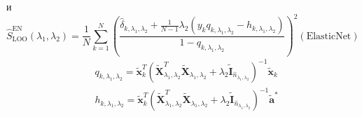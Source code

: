 \documentclass[12pt, twoside]{article}
\begin{document}
и
\begin{equation}
\hat{S}_{\mathrm{LOO}}^{\mathrm{EN}}\left(\lambda_{1}, \lambda_{2}\right)=\frac{1}{N} \sum_{k=1}^{N}\left(\frac{\hat{\delta}_{k, \lambda_{1}, \lambda_{2}}+\frac{1}{N-1} \lambda_{2}\left(y_{k} q_{k, \lambda_{1}, \lambda_{2}}-h_{k, \lambda_{1}, \lambda_{2}}\right)}{1-q_{k, \lambda_{1}, \lambda_{2}}}\right)^{2}(\text {ElasticNet})
\end{equation}
\begin{equation}
\begin{aligned}
&q_{k, \lambda_{1}, \lambda_{2}}=\tilde{\mathbf{x}}_{k}^{T}\left(\tilde{\mathbf{X}}_{\lambda_{1}, \lambda_{2}}^{T} \tilde{\mathbf{X}}_{\lambda_{1}, \lambda_{2}}+\lambda_{2} \tilde{\mathbf{I}}_{\hat{n}_{\lambda_{1}, \lambda_{2}}}\right)^{-1} \tilde{\mathbf{x}}_{k}\\
&h_{k, \lambda_{1}, \lambda_{2}}=\tilde{\mathbf{x}}_{k}^{T}\left(\tilde{\mathbf{X}}_{\lambda_{1}, \lambda_{2}}^{T} \tilde{\mathbf{X}}_{\lambda_{1}, \lambda_{2}}+\lambda_{2} \tilde{\mathbf{I}}_{\hat{n}_{\lambda_{1}, \lambda_{2}}}\right)^{-1} \tilde{\mathbf{a}}^{*}
\end{aligned}
\end{equation}
\end{document}

